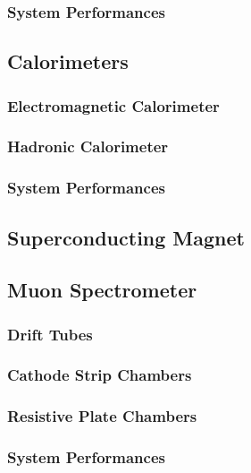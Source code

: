             \subsubsection{System Performances}  

        \subsection{Calorimeters}

            \subsubsection{Electromagnetic Calorimeter}

            \subsubsection{Hadronic Calorimeter}

            \subsubsection{System Performances}  

        \subsection{Superconducting Magnet}

        \subsection{Muon Spectrometer}

            \subsubsection{Drift Tubes}

            \subsubsection{Cathode Strip Chambers}
        
            \subsubsection{Resistive Plate Chambers}

            \subsubsection{System Performances} 

